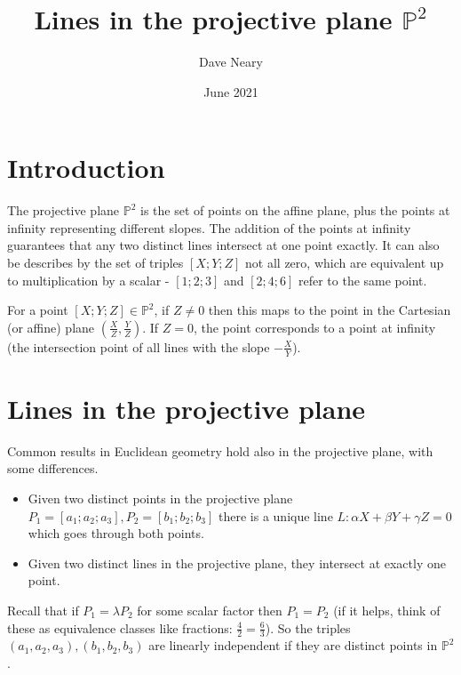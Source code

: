 \documentclass{article}
\title{Lines in the projective plane $\mathbb{P}^2$}
\author{Dave Neary}
\date{June 2021}
\begin{document}
\maketitle

\section{Introduction}

The projective plane $\mathbb{P}^2$ is the set of points on the affine plane, plus
the points at infinity representing different slopes. The addition of the points at
infinity guarantees that any two distinct lines intersect at one point exactly. It can
also be describes by the set of triples $[X; Y; Z]$ not all zero, which are equivalent
up to multiplication by a scalar - $[1; 2; 3]$ and $[2; 4; 6]$ refer to the same point.

For a point $[X;Y;Z] \in \mathbb{P}^2$, if $Z \neq 0$ then this maps to the point in
the Cartesian (or affine) plane $(\frac{X}{Z}, \frac{Y}{Z})$. If $Z=0$, the point
corresponds to a point at infinity (the intersection point of all lines with the
slope $-\frac{X}{Y}$).

\section{Lines in the projective plane}

Common results in Euclidean geometry hold also in the projective plane, with some differences.

\begin{itemize}
    \item Given two distinct points in the projective plane $P_1=[a_1; a_2; a_3],
    P_2=[b_1; b_2; b_3]$ there is a unique line $L: \alpha X + \beta Y + \gamma Z = 0$
    which goes through both points.
    \item Given two distinct lines in the projective plane, they intersect at exactly one point.
\end{itemize}

Recall that if $P_1 = \lambda P_2$ for some scalar factor then $P_1=P_2$ (if it helps, think
of these as equivalence classes like fractions: $\frac{4}{2} = \frac{6}{3}$). So the triples
$(a_1, a_2, a_3), (b_1, b_2, b_3)$ are linearly independent if they are distinct points in $\mathbb{P}^2$.
\end{document}
